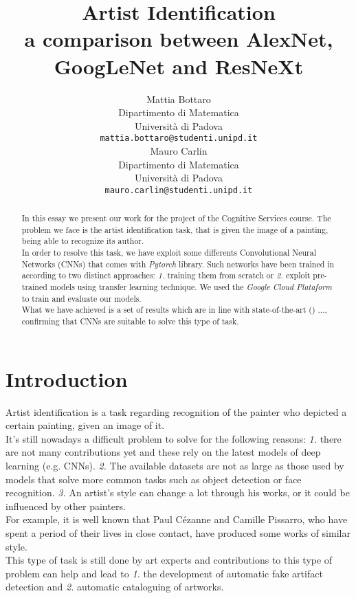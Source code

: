\documentclass{article}
\title{Artist Identification	\\  a comparison between AlexNet, GoogLeNet and ResNeXt}
\author{
  Mattia Bottaro \\
  Dipartimento  di Matematica\\
  Università di Padova \\
  \texttt{mattia.bottaro@studenti.unipd.it} \\
   \And
  Mauro Carlin \\
Dipartimento  di Matematica\\
Università di Padova \\
\texttt{mauro.carlin@studenti.unipd.it} \\
}
\begin{document}
\maketitle

\begin{abstract}
	In this essay we present our work for the project of the Cognitive Services course.
	The problem we face is the artist identification task, that is given the image of a painting, being able to recognize its author.\\
	In order to resolve this task, we have exploit some differents Convolutional Neural Networks (CNNs) that comes with \textit{Pytorch} library. Such networks have been trained in according to two distinct approaches: \textit{1.} training them from scratch or  \textit{2.} exploit pre-trained models using transfer learning technique. We used the \textit{Google Cloud Plataform} to train and evaluate our models.\\
	What we have achieved is a set of results which are in line with  state-of-the-art (\cite{ArtistIdCNN406}) ..., confirming that CNNs are suitable to solve this type of task.
\end{abstract}




\section{Introduction}
Artist identification is a task regarding recognition of the painter who depicted a certain painting, given an image of it.\\
It's still nowadays a difficult problem to solve for the following reasons: \textit{1.} there are not many contributions yet and these rely on the latest models of deep learning (e.g. CNNs). \textit{2.} The available datasets are not as large as those used by models that solve more common tasks such as object detection or face recognition. \textit{3.} An artist's style can change a lot through his works, or it could be influenced by other painters. \\For example, it is well known that Paul Cézanne and Camille Pissarro, who have spent a period of their lives in close contact, have produced some works of similar style.\\
This type of task is still done by art experts and contributions to this type of problem can help and lead to \textit{1.} the development of automatic fake artifact detection and \textit{2.} automatic cataloguing of artworks.\\
\end{document}
